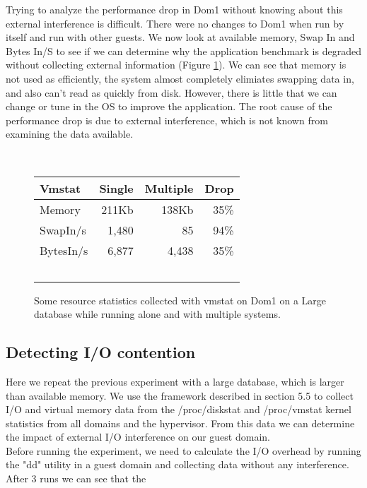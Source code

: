 \indent Trying to analyze the performance drop in Dom1 without knowing about this external interference is difficult.  There were no changes to Dom1 when run by itself and run with other guests.  We now look at available memory, Swap In and Bytes In/S to see if we can determine why the application benchmark is degraded without collecting external information (Figure \ref{fig:vmstat}).  We can see that memory is not used as efficiently, the system almost completely elimiates swapping data in, and also can't read as quickly from disk.  However, there is little that we can change or tune in the OS to improve the application.  The root cause of the performance drop is due to external interference, which is not known from examining the data available.
\begin{figure}
  \begin{tabular}{ l | r | r | r }
    Vmstat & Single & Multiple & Drop \\ \hline
	Memory & 211Kb & 138Kb & 35\% \\
	SwapIn/s & 1,480 & 85 & 94\% \\
	BytesIn/s & 6,877 & 4,438 & 35\% \\
  \end{tabular}
\caption{Some resource statistics collected with vmstat on Dom1 on a Large database while running alone and with multiple systems.} 
\label{fig:vmstat}
\end{figure}

\subsection{Detecting I/O contention}
Here we repeat the previous experiment with a large database, which is larger than available memory. We use the framework described in section 5.5 to collect I/O and virtual memory data from the /proc/diskstat and /proc/vmstat kernel statistics from all domains and the hypervisor.  From this data we can determine the impact of external I/O interference on our guest domain.\\
Before running the experiment, we need to calculate the I/O overhead by running the "dd" utility in a guest domain and collecting data without any interference.  After 3 runs we can see that the 



